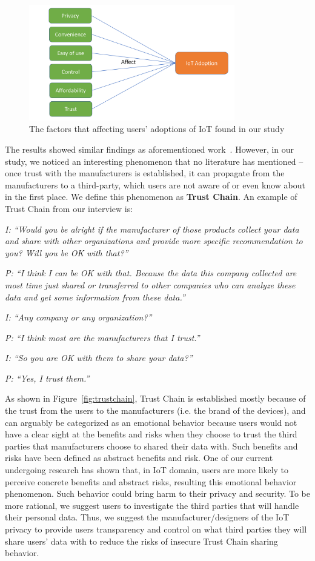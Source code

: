 \begin{figure}
	\centering
	\includegraphics[width=0.8\textwidth]{figures/pilot_study_model.pdf}
	\caption{The factors that affecting users' adoptions of IoT found in our study}
	\label{fig:pilotstudymodel}
\end{figure}

The results showed similar findings as aforementioned work~\cite{gao2014unified, al2016modeling}. However, in our study, we noticed an interesting phenomenon that no literature has mentioned -- once trust with the manufacturers is established, it can propagate from the manufacturers to a third-party, which users are not aware of or even know about in the first place. We define this phenomenon as \textbf{Trust Chain}. An example of Trust Chain from our interview is:

\textit{I: ``Would you be alright if the manufacturer of those products collect your data and share with other organizations and provide more specific recommendation to you? Will you be OK with that?''}

\textit{P: ``I think I can be OK with that. Because the data this company collected are most time just shared or transferred to other companies who can analyze these data and get some information from these data.''}

\textit{I: ``Any company or any organization?''}

\textit{P: ``I think most are the manufacturers that I trust.''}

\textit{I: ``So you are OK with them to share your data?''}

\textit{P: ``Yes, I trust them.''}

As shown in Figure~\ref{fig:trustchain}, Trust Chain is established mostly because of the trust from the users to the manufacturers (i.e. the brand of the devices), and can arguably be categorized as an emotional behavior because users would not have a clear sight at the benefits and risks when they choose to trust the third parties that manufacturers choose to shared their data with. Such benefits and risks have been defined as abstract benefits and risk. One of our current undergoing research has shown that, in IoT domain, users are more likely to perceive concrete benefits and abstract risks, resulting this emotional behavior phenomenon. Such behavior could bring harm to their privacy and security. To be more rational, we suggest users to investigate the third parties that will handle their personal data. Thus, we suggest the manufacturer/designers of the IoT privacy to provide users transparency and control on what third parties they will share users' data with to reduce the risks of insecure Trust Chain sharing behavior.

